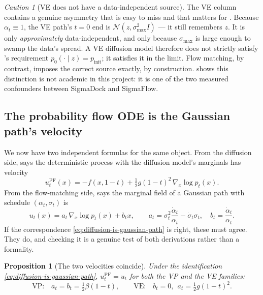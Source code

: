 \documentclass[11pt,a4paper]{report}
\newtheorem{proposition}[proposition]{Proposition}
\theoremstyle{definition}
\theoremstyle{remark}
\newtheorem{caution}[caution]{Caution}
\begin{document}
\begin{caution}[VE does not have a data-independent source]
\label{caution:ve-source}
The VE column contains a genuine asymmetry that is easy to miss and that
matters for . Because $\alpha_t\equiv1$, the VE path's
$t=0$ end is $\mathcal N(z,\sigma_{\max}^2I)$ --- it still remembers $z$. It
is only \emph{approximately} data-independent, and only because
$\sigma_{\max}$ is large enough to swamp the data's spread. A VE diffusion
model therefore does not strictly satisfy 's
requirement $p_0(\cdot\mid z)=p_{\mathrm{init}}$; it satisfies it in the
limit. Flow matching, by contrast, imposes the correct source exactly, by
construction.  shows this distinction
is not academic in this project: it is one of the two measured confounders
between SigmaDock and SigmaFlow.
\end{caution}

\subsection{The probability flow ODE is the Gaussian path's velocity}

We now have two independent formulas for the same object. From the
diffusion side,  says the deterministic process
with the diffusion model's marginals has velocity
\begin{equation}
\label{eq:pfode-recall}
u_t^{\mathrm{PF}}(x) = -f(x,1-t) + \tfrac12g(1-t)^2\,\nabla_x\log p_t(x) .
\end{equation}
From the flow-matching side,  says the marginal
field of a Gaussian path with schedule $(\alpha_t,\sigma_t)$ is
\begin{equation}
\label{eq:fm-vel-recall}
u_t(x) = a_t\,\nabla_x\log p_t(x) + b_tx,
\qquad
a_t=\sigma_t^2\frac{\dot\alpha_t}{\alpha_t}-\dot\sigma_t\sigma_t,
\quad
b_t=\frac{\dot\alpha_t}{\alpha_t} .
\end{equation}
If the correspondence \eqref{eq:diffusion-is-gaussian-path} is right, these
must agree. They do, and checking it is a genuine test of both derivations
rather than a formality.

\begin{proposition}[The two velocities coincide]
\label{prop:pfode-is-fm}
Under the identification \eqref{eq:diffusion-is-gaussian-path},
$u_t^{\mathrm{PF}} = u_t$ for both the VP and the VE families:
\[
\text{VP:}\quad a_t=b_t=\tfrac12\beta(1-t) ,
\qquad
\text{VE:}\quad b_t=0,\ \ a_t=\tfrac12g(1-t)^2 .
\]
\end{proposition}
\end{document}
